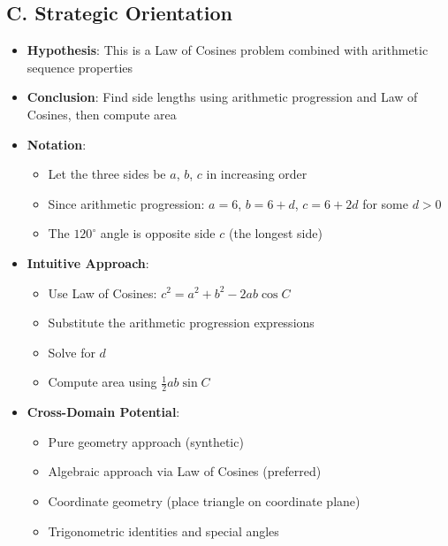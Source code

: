 \documentclass[12pt]{article}
\begin{document}
\begin{problemconfigbox}
\subsection*{C. Strategic Orientation}
\begin{itemize}[leftmargin=*]
    \item \textbf{Hypothesis}: This is a Law of Cosines problem combined with arithmetic sequence properties
    \item \textbf{Conclusion}: Find side lengths using arithmetic progression and Law of Cosines, then compute area
    \item \textbf{Notation}: 
    \begin{itemize}
        \item Let the three sides be $a$, $b$, $c$ in increasing order
        \item Since arithmetic progression: $a = 6$, $b = 6 + d$, $c = 6 + 2d$ for some $d > 0$
        \item The $120^\circ$ angle is opposite side $c$ (the longest side)
    \end{itemize}
    \item \textbf{Intuitive Approach}: 
    \begin{itemize}
        \item Use Law of Cosines: $c^2 = a^2 + b^2 - 2ab \cos C$
        \item Substitute the arithmetic progression expressions
        \item Solve for $d$
        \item Compute area using $\frac{1}{2}ab \sin C$
    \end{itemize}
    \item \textbf{Cross-Domain Potential}: 
    \begin{itemize}
        \item Pure geometry approach (synthetic)
        \item Algebraic approach via Law of Cosines (preferred)
        \item Coordinate geometry (place triangle on coordinate plane)
        \item Trigonometric identities and special angles
    \end{itemize}
\end{itemize}
\end{problemconfigbox}
\end{document}
